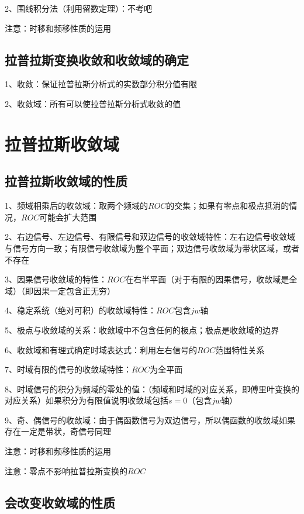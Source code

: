 2、围线积分法（利用留数定理）：不考吧

注意：时移和频移性质的运用



\subsection{拉普拉斯变换收敛和收敛域的确定}

1、收敛：保证拉普拉斯分析式的实数部分积分值有限

2、收敛域：所有可以使拉普拉斯分析式收敛的值

\section{拉普拉斯收敛域}



\subsection{拉普拉斯收敛域的性质}

1、频域相乘后的收敛域：取两个频域的$ROC$的交集；如果有零点和极点抵消的情况，$ROC$可能会扩大范围

2、右边信号、左边信号、有限信号和双边信号的收敛域特性：左右边信号收敛域与信号方向一致；有限信号收敛域为整个平面；双边信号收敛域为带状区域，或者不存在

3、因果信号收敛域的特性：$ROC$在右半平面（对于有限的因果信号，收敛域是全域）（即因果一定包含正无穷）

4、稳定系统（绝对可积）的收敛域特性：$ROC$包含$jw$轴

5、极点与收敛域的关系：收敛域中不包含任何的极点；极点是收敛域的边界

6、收敛域和有理式确定时域表达式：利用左右信号的$ROC$范围特性关系

7、时域有限的信号的收敛域特性：$ROC$为全平面

8、时域信号的积分为频域的零处的值：（频域和时域的对应关系，即傅里叶变换的对应关系）如果积分为有限值说明收敛域包括$s=0$（包含$jw$轴）

9、奇、偶信号的收敛域：由于偶函数信号为双边信号，所以偶函数的收敛域如果存在一定是带状，奇信号同理

注意：时移和频移性质的运用

注意：零点不影响拉普拉斯变换的$ROC$



\subsection{会改变收敛域的性质}

